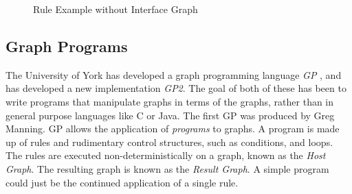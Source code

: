 \documentclass{UoYCSproject}
\begin{document}
\begin{figure}
\label{fig:simple_rule_sans_k}
\centering
{}
\caption{Rule Example without Interface Graph}
\end{figure}

\subsection{Graph Programs}
The University of York has developed a graph programming language \emph{GP} \cite{gp1}, and has developed a new implementation \emph{GP2}. The goal of both of these has been to write programs that manipulate graphs in terms of the graphs, rather than in general purpose languages like C or Java. The first GP was produced by Greg Manning. %
GP allows the application of \emph{programs} to graphs. A program is made up of rules and rudimentary control structures, such as conditions, and loops. The rules are executed non-deterministically on a graph, known as the \emph{Host Graph}. The resulting graph is known as the \emph{Result Graph}. A simple program could just be the continued application of a single rule.
\end{document}
